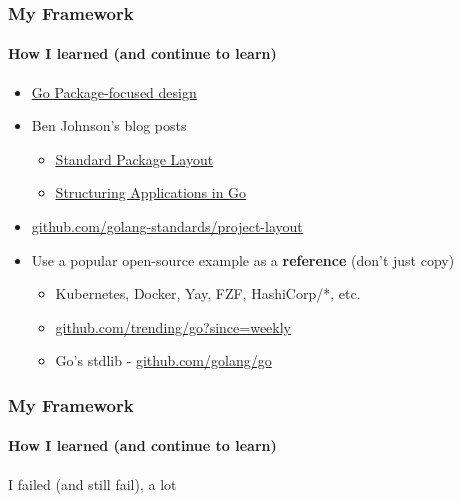 
\begin{frame}
  \frametitle{My Framework}
  \framesubtitle{How I learned (and continue to learn)}

  \begin{itemize}
    \item \href{https://blog.gopheracademy.com/advent-2016/go-and-package-focused-design/}{Go Package-focused design}
    \item Ben Johnson's blog posts
    \begin{itemize}
      \item \href{https://medium.com/@benbjohnson/standard-package-layout-7cdbc8391fc1}{Standard Package Layout}
      \item \href{https://medium.com/@benbjohnson/structuring-applications-in-go-3b04be4ff091}{Structuring Applications in Go}
    \end{itemize}
  \item \url{github.com/golang-standards/project-layout}
  \item Use a popular open-source example as a \textbf{reference} (don't just copy)
  \begin{itemize}
    \item Kubernetes, Docker, Yay, FZF, HashiCorp/*, etc.
    \item \url{github.com/trending/go?since=weekly}
    \item Go's stdlib - \url{github.com/golang/go}
  \end{itemize}
  \end{itemize}
\end{frame}

\begin{frame}
  \frametitle{My Framework}
  \framesubtitle{How I learned (and continue to learn)}

  \centering
  \LARGE I failed (and still fail), a lot
\end{frame}
